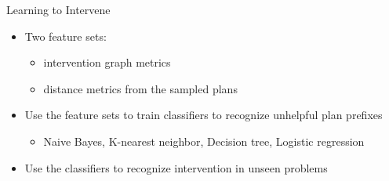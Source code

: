 \begin{frame}{Learning to Intervene}
\begin{itemize}
\item Two feature sets:
\begin{itemize}
\item intervention graph metrics
\item distance metrics from the sampled plans
\end{itemize}
\item Use the feature sets to train classifiers to recognize unhelpful plan prefixes
\begin{itemize}
\item Naive Bayes, K-nearest neighbor, Decision tree, Logistic regression
\end{itemize}
\item Use the classifiers to recognize intervention in unseen problems
\end{itemize}

\end{frame}